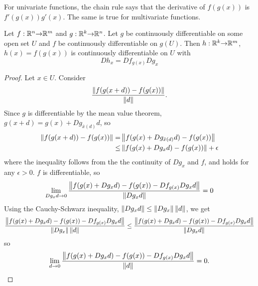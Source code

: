 For univariate functions, the chain rule says that the derivative of
$f(g(x))$ is $f'(g(x)) g'(x)$. The same is true for multivariate
functions.
\begin{theorem} \label{thm:chain}
  Let $f:\mathbb{R}^n {\rightarrow} \mathbb{R}^m$ and $g: \mathbb{R}^k {\rightarrow} \mathbb{R}^n$. Let $g$ be
  continuously differentiable on some open set $U$ and $f$ be
  continuously differentiable on $g(U)$. Then $h:\mathbb{R}^k {\rightarrow} \mathbb{R}^m$, $h
  (x) = f(g(x))$ 
  is continuously differentiable on $U$ with 
  \[ Dh_x = D f_{g(x)} D g_x \]
\end{theorem}
\begin{proof}
  Let $x \in U$. Consider
  \begin{align*}
    \frac{\left\Vert { f(g(x+d)) - f(g(x))} \right\Vert} {\left\Vert {d} \right\Vert}.
  \end{align*}
  Since $g$ is differentiable by the mean value theorem, $g(x+d) =
  g(x) + Dg_{\bar{x}(d)} d$, so
  \begin{align*}
    \left\Vert { f(g(x+d)) - f(g(x))} \right\Vert = &  
    \left\Vert { f(g(x) + D g_{\bar{x}(d)} d ) - f(g(x))} \right\Vert \\
    \leq & \left\Vert {f(g(x) + D g_x d) - f(g(x))} \right\Vert + \epsilon
  \end{align*}
  where the inequality follows from the the continuity of $D g_x$ and
  $f$, and holds for any $\epsilon >0$. $f$ is differentiable, so
  \[ \lim_{D g_x d {\rightarrow} 0} \frac{\left\Vert {f(g(x) + D g_x d) -
      f(g(x)) - D f_{g(x)} D g_x d} \right\Vert} {\left\Vert {D g_x d} \right\Vert} = 0 \]
  Using the Cauchy-Schwarz inequality, $\left\Vert {D g_x d} \right\Vert \leq \left\Vert {D
    g_x} \right\Vert \left\Vert {d} \right\Vert$, we get
  \[ \frac{\left\Vert {f(g(x) + D g_x d) -
      f(g(x)) - D f_{g(x)} D g_x d} \right\Vert} {\left\Vert {D g_x} \right\Vert \left\Vert {d} \right\Vert} \leq
  \frac{\left\Vert {f(g(x) + D g_x d) -
      f(g(x)) - D f_{g(x)} D g_x d} \right\Vert} {\left\Vert {D g_x d} \right\Vert} 
  \]
  so
  \[ \lim_{ d {\rightarrow} 0} \frac{\left\Vert {f(g(x) + D g_x d) -
      f(g(x)) - D f_{g(x)} D g_x d} \right\Vert} {\left\Vert {d} \right\Vert} = 0. \]   
\end{proof}

